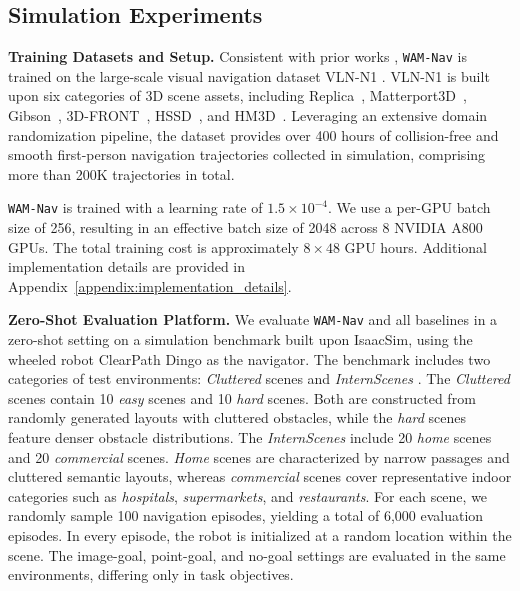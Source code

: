 \documentclass{article}
\begin{document}
\subsection{Simulation Experiments}

\noindent\textbf{Training Datasets and Setup.}
Consistent with prior works \citep{peng2025logoplanner,cai2025navdp}, \texttt{WAM-Nav} is trained on the large-scale visual navigation dataset VLN-N1 \citep{wang2025internvla, interndata2025}. VLN-N1 is built upon six categories of 3D scene assets, including Replica~\citep{Straub2019Replica}, Matterport3D~\citep{Chang2017Matterport3D}, Gibson~\citep{Xia2018Gibson}, 3D-FRONT~\citep{fu20203dfront}, HSSD~\citep{Khanna2023HSSD}, and HM3D~\citep{Ramakrishnan2021HM3D}. Leveraging an extensive domain randomization pipeline, the dataset provides over 400 hours of collision-free and smooth first-person navigation trajectories collected in simulation, comprising more than 200K trajectories in total.

\texttt{WAM-Nav} is trained with a learning rate of \(1.5\times10^{-4}\). We use a per-GPU batch size of 256, resulting in an effective batch size of 2048 across 8 NVIDIA A800 GPUs. The total training cost is approximately \(8\times48\) GPU hours. Additional implementation details are provided in Appendix~\ref{appendix:implementation_details}.

\noindent\textbf{Zero-Shot Evaluation Platform.}
We evaluate \texttt{WAM-Nav} and all baselines in a zero-shot setting on a simulation benchmark built upon IsaacSim, using the wheeled robot ClearPath Dingo as the navigator. The benchmark includes two categories of test environments: \textit{Cluttered} scenes and \textit{InternScenes} \citep{cai2025navdp, wang2025internvla, wang2024grutopia}.
The \textit{Cluttered} scenes contain 10 \textit{easy} scenes and 10 \textit{hard} scenes. Both are constructed from randomly generated layouts with cluttered obstacles, while the \textit{hard} scenes feature denser obstacle distributions. The \textit{InternScenes} include 20 \textit{home} scenes and 20 \textit{commercial} scenes. \textit{Home} scenes are characterized by narrow passages and cluttered semantic layouts, whereas \textit{commercial} scenes cover representative indoor categories such as \textit{hospitals}, \textit{supermarkets}, and \textit{restaurants}. For each scene, we randomly sample 100 navigation episodes, yielding a total of 6,000 evaluation episodes. In every episode, the robot is initialized at a random location within the scene. The image-goal, point-goal, and no-goal settings are evaluated in the same environments, differing only in task objectives.
\end{document}
